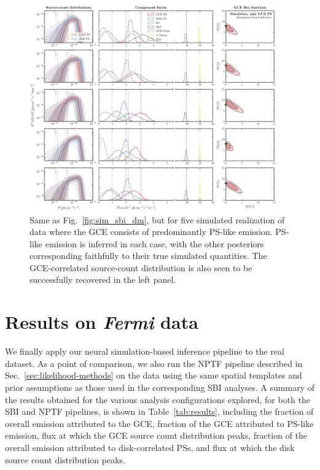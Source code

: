 \documentclass[prd,aps,10pt,nofootinbib,twocolumn,superscriptaddress,preprintnumbers,balancelastpage,longbibliography]{revtex4-1}
\begin{document}
%
\begin{figure}
\centering
\includegraphics[width=0.95\textwidth]{plots/sim_sbi_ps.pdf}
\caption{Same as Fig.~\ref{fig:sim_sbi_dm}, but for five simulated realization of \Fermi data where the GCE consists of predominantly PS-like emission. PS-like emission is inferred in each case, with the other posteriors corresponding faithfully to their true simulated quantities. The GCE-correlated source-count distribution is also seen to be successfully recovered in the left panel.}
\label{fig:sim_sbi_ps}
\end{figure}
%

\section{Results on \emph{Fermi} data}
\label{sec:data}

We finally apply our neural simulation-based inference pipeline to the real \Fermi dataset. As a point of comparison, we also run the NPTF pipeline described in Sec.~\ref{sec:likelihood-methods} on the data using the same spatial templates and prior assumptions as those used in the corresponding SBI analyses. A summary of the results obtained for the various analysis configurations explored, for both the SBI and NPTF pipelines, is shown in Table~\ref{tab:results}, including the fraction of overall emission attributed to the GCE, fraction of the GCE attributed to PS-like emission, flux at which the GCE source count distribution peaks, fraction of the overall emission attributed to disk-correlated PSs, and flux at which the disk source count distribution peaks.
\end{document}
